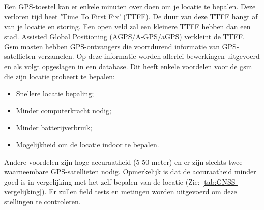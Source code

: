 \subsection{}
Een GPS-toestel kan er enkele minuten over doen om je locatie te bepalen. Deze verloren tijd heet 'Time To First Fix' (TTFF). De duur van deze TTFF hangt af van je locatie en storing. Een open veld zal een kleinere TTFF hebben dan een stad. Assisted Global Positioning (AGPS/A-GPS/aGPS) verkleint de TTFF. 
\newline
Gsm masten hebben GPS-ontvangers die voortdurend informatie van GPS-satellieten verzamelen. Op deze informatie worden allerlei bewerkingen uitgevoerd en als volgt opgeslagen in een database. Dit heeft enkele voordelen voor de gsm die zijn locatie probeert te bepalen:
\begin{itemize}
	\item Snellere locatie bepaling;
	\item Minder computerkracht nodig;
	\item Minder batterijverbruik;
	\item Mogelijkheid om de locatie indoor te bepalen.
\end{itemize} 
Andere voordelen zijn hoge accuraatheid (5-50 meter) en er zijn slechts twee waarneembare GPS-satellieten nodig.
Opmerkelijk is dat de accuraatheid minder goed is in vergelijking met het zelf bepalen van de locatie (Zie: \ref{tab:GNSS-vergelijking}). Er zullen field tests en metingen worden uitgevoerd om deze stellingen te controleren. \autocite{agps}
